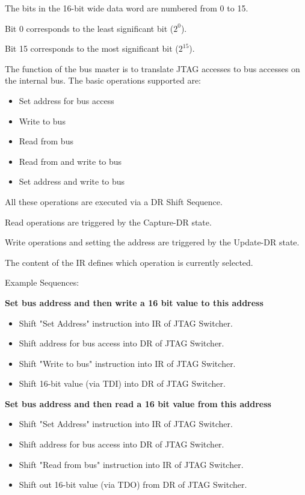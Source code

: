 \documentclass[10pt,english,a4paper]{report}
\begin{document}
The bits in the 16-bit wide data word are numbered from 0 to 15.

Bit 0 corresponds to the least significant bit ($2^0$).

Bit 15 corresponds to the most significant bit ($2^{15}$).

The function of the bus master is to translate JTAG accesses to
bus accesses on the internal bus. The basic operations supported are:
\begin{itemize}
\item Set address for bus access
\item Write to bus
\item Read from bus
\item Read from and write to bus
\item Set address and write to bus
\end{itemize}
All these operations are executed via a DR Shift Sequence.

Read operations are triggered by the Capture-DR state.

Write operations and setting the address are triggered by the Update-DR state.

The content of the IR defines which operation is currently selected.

\newpage
Example Sequences:

{\bf Set bus address and then write a 16 bit value to this address}
\begin{itemize}
\item Shift "Set Address" instruction into IR of JTAG Switcher.
\item Shift address for bus access into DR of JTAG Switcher.
\item Shift "Write to bus" instruction into IR of JTAG Switcher.
\item Shift 16-bit value (via TDI) into DR of JTAG Switcher.
\end{itemize}

{\bf Set bus address and then read a 16 bit value from this address}
\begin{itemize}
\item Shift "Set Address" instruction into IR of JTAG Switcher.
\item Shift address for bus access into DR of JTAG Switcher.
\item Shift "Read from bus" instruction into IR of JTAG Switcher.
\item Shift out 16-bit value (via TDO) from DR of JTAG Switcher.
\end{itemize}
\end{document}
